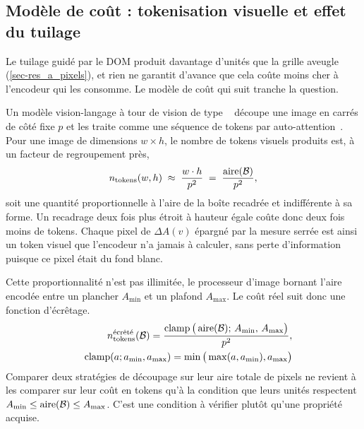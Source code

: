 \subsection{Modèle de coût : tokenisation visuelle et effet du tuilage}
\label{sec-eda_cout_visuel}
 
Le tuilage guidé par le DOM produit davantage d'unités que la grille aveugle
(\cref{sec-res_a_pixels}), et rien ne garantit d'avance que cela coûte moins
cher à l'encodeur qui les consomme. Le modèle de coût qui suit tranche la
question.
 
Un modèle vision-langage à tour de vision de type ~\citep{vit2021} découpe une image en  carrés de
côté fixe $p$ et les traite comme une séquence de tokens par
auto-attention~\citep{transformer2017}. Pour une image de dimensions
$w \times h$, le nombre de tokens visuels produits est, à un facteur de
regroupement près,
\begin{equation}
n_{\text{tokens}}(w, h) \;\approx\; \frac{w \cdot h}{p^2} \;=\; \frac{\operatorname{\text{\normalfont aire}}(\mathcal{B})}{p^2},
\label{eq-tokens}
\end{equation}
soit une quantité proportionnelle à l'aire de la boîte recadrée et indifférente
à sa forme. Un recadrage deux fois plus étroit à hauteur égale coûte donc deux
fois moins de tokens. Chaque pixel de $\Delta A(v)$ épargné par la mesure serrée
est ainsi un token visuel que l'encodeur n'a jamais à calculer, sans perte
d'information puisque ce pixel était du fond blanc.
 
Cette proportionnalité n'est pas illimitée, le processeur d'image bornant
l'aire encodée entre un plancher $A_{\min}$ et un plafond $A_{\max}$. Le coût
réel suit donc une fonction d'écrêtage.
\begin{equation}
\begin{split}
    n_{\text{tokens}}^{\text{écrêté}}(\mathcal{B}) = \frac{\operatorname{\text{\normalfont clamp}}\big(\operatorname{\text{\normalfont aire}}(\mathcal{B});\, A_{\min},\, A_{\max}\big)}{p^2},\\
    \quad
    \operatorname{\text{\normalfont clamp}}(a; a_{\min}, a_{\max}) = \min\big(\max(a, a_{\min}), a_{\max}\big)
\end{split}
\label{eq-tokens_clamp}
\end{equation}
Comparer deux stratégies de découpage sur leur aire totale de pixels ne revient
à les comparer sur leur coût en tokens qu'à la condition que leurs unités
respectent $A_{\min} \leq \operatorname{\text{\normalfont aire}}(\mathcal{B}) \leq A_{\max}$. C'est une
condition à vérifier plutôt qu'une propriété acquise.
 
